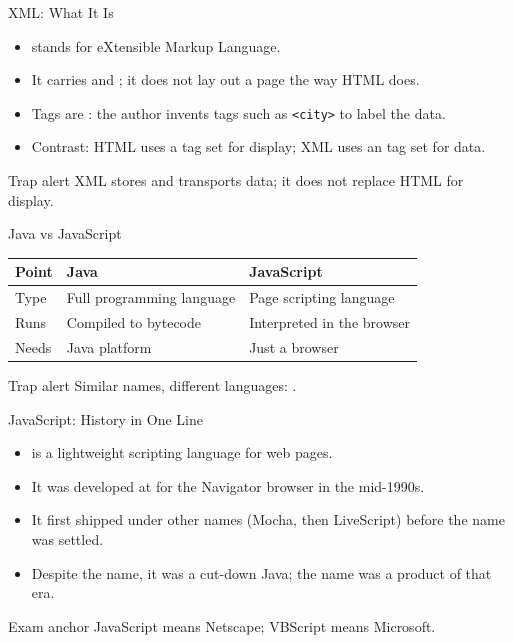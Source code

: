 \documentclass[aspectratio=169]{beamer}
\begin{document}
\begin{frame}{XML: What It Is}
  \begin{itemize}
    \item {} stands for eXtensible Markup Language.
    \item It carries and ; it does not lay out a page the way
      HTML does.
    \item Tags are : the author invents tags such as
      \texttt{<city>} to label the data.
    \item Contrast: HTML uses a  tag set for display; XML uses an
       tag set for data.
  \end{itemize}
  \begin{alertblock}{Trap alert}
    XML stores and transports data; it does not replace HTML for display.
  \end{alertblock}
\end{frame}

\begin{frame}{Java vs JavaScript}
  \begin{center}
    \begin{tabular}{lll}
      \toprule
      \textbf{Point} & \textbf{Java} & \textbf{JavaScript} \\
      \midrule
      Type & Full programming language & Page scripting language \\
      Runs & Compiled to bytecode & Interpreted in the browser \\
      Needs & Java platform & Just a browser \\
      \bottomrule
    \end{tabular}
  \end{center}
  \vspace{0.35cm}
  \begin{alertblock}{Trap alert}
    Similar names, different languages: .
  \end{alertblock}
\end{frame}

\begin{frame}{JavaScript: History in One Line}
  \begin{itemize}
    \item {} is a lightweight scripting language for web pages.
    \item It was developed at  for the Navigator browser in the
      mid-1990s.
    \item It first shipped under other names (Mocha, then LiveScript) before
      the  name was settled.
    \item Despite the name, it was  a cut-down Java; the name was a
      product of that era.
  \end{itemize}
  \begin{block}{Exam anchor}
    JavaScript means Netscape; VBScript means Microsoft.
  \end{block}
\end{frame}
\end{document}
